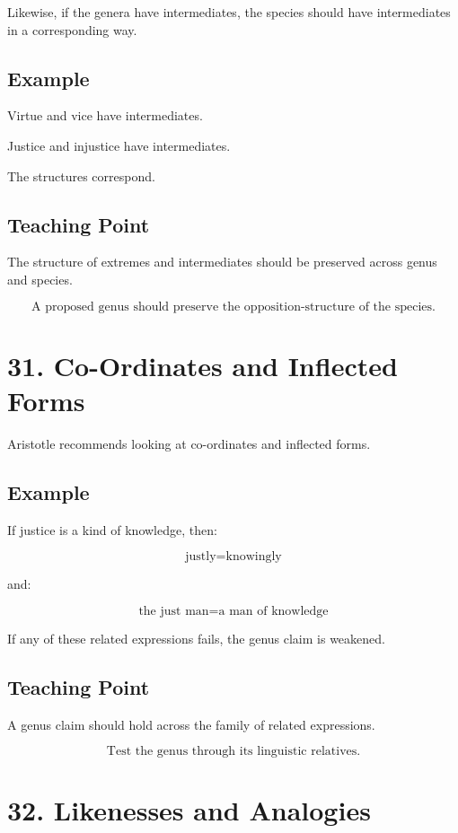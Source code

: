 \documentclass[12pt]{article}
\begin{document}
Likewise, if the genera have intermediates, the species should have
intermediates in a corresponding way.

\subsection*{Example}

Virtue and vice have intermediates.

Justice and injustice have intermediates.

The structures correspond.

\subsection*{Teaching Point}

The structure of extremes and intermediates should be preserved across genus
and species.

\[
\boxed{
\text{A proposed genus should preserve the opposition-structure of the species.}
}
\]

\section*{31. Co-Ordinates and Inflected Forms}

Aristotle recommends looking at co-ordinates and inflected forms.

\subsection*{Example}

If justice is a kind of knowledge, then:

\[
\text{justly} = \text{knowingly}
\]

and:

\[
\text{the just man} = \text{a man of knowledge}
\]

If any of these related expressions fails, the genus claim is weakened.

\subsection*{Teaching Point}

A genus claim should hold across the family of related expressions.

\[
\boxed{
\text{Test the genus through its linguistic relatives.}
}
\]

\section*{32. Likenesses and Analogies}
\end{document}
